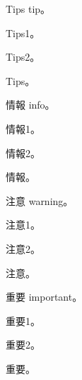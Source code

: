 Tips tip。

\begin{reviewtip}

Tips1。

Tips2。

\end{reviewtip}
\begin{reviewtip}

Tips。

\end{reviewtip}

情報 info。

\begin{reviewinfo}

情報1。

情報2。

\end{reviewinfo}
\begin{reviewinfo}

情報。

\end{reviewinfo}

注意 warning。

\begin{reviewwarning}

注意1。

注意2。

\end{reviewwarning}
\begin{reviewwarning}

注意。

\end{reviewwarning}

重要 important。

\begin{reviewimportant}

重要1。

重要2。

\end{reviewimportant}
\begin{reviewimportant}

重要。

\end{reviewimportant}

